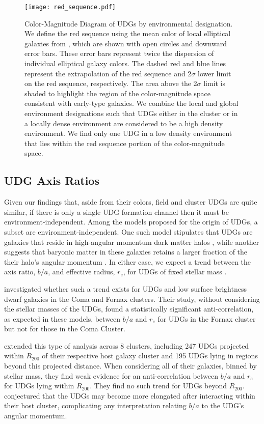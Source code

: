\documentclass[twocolumn,tighten]{aastex63}
\begin{document}
\begin{figure}
\texttt{[image: red\_sequence.pdf]}
\caption{Color-Magnitude Diagram of UDGs by environmental designation. We define the red sequence using the mean color of local elliptical galaxies from \cite{Schombert2016}, which are shown with open circles and downward error bars. These error bars represent twice the dispersion of individual elliptical galaxy colors. The dashed red and blue lines represent the extrapolation of the red sequence and 2$\sigma$ lower limit on the red sequence, respectively. The area above the 2$\sigma$ limit is shaded to highlight the region of the color-magnitude space consistent with early-type galaxies. We combine the local and global environment designations such that UDGs either in the cluster or in a locally dense environment are considered to be a high density environment. We find only one UDG in a low density environment that lies within the red sequence portion of the color-magnitude space.}
\label{fig:red_sequence}
\end{figure}

\subsection{UDG Axis Ratios}
\label{sec:axis_ratios}

Given our findings that, aside from their colors, field and cluster UDGs are quite similar, if there is only a single UDG formation channel then it must be environment-independent.
Among the models proposed for the origin of UDGs, a subset are 
environment-independent. 
One such model stipulates that UDGs are galaxies that reside in high-angular momentum dark matter halos 
\citep{Amorisco2016}, while another suggests that baryonic matter in these galaxies retains a larger fraction of the their halo's angular momentum \citep{Posti2018}.
In either case, we expect a trend between the axis ratio, $b/a$, and effective radius, $r_e$, for UDGs of fixed stellar mass \citep[cf.,][]{Dalcanton1997}. 

\cite{Venhola2017}  investigated whether such a trend exists for UDGs and low surface brightness dwarf galaxies in the Coma and Fornax clusters. Their study, without considering the stellar masses of the UDGs, found a statistically significant anti-correlation, as expected in these models, between $b/a$ and $r_e$ for UDGs in the Fornax cluster but not for those in the Coma Cluster.

\cite{Pina2019} extended this type of analysis across 8 clusters, including 247 UDGs projected within $R_{200}$ of their respective host galaxy cluster and 195 UDGs lying in regions beyond this projected distance.
When considering all of their galaxies, binned by stellar mass, they find weak evidence for an anti-correlation between $b/a$ and $r_e$ for UDGs lying within $R_{200}$. They find no such trend for UDGs beyond $R_{200}$. 
\cite{Pina2019} conjectured that the UDGs may become more elongated after interacting within their host cluster, complicating any interpretation relating $b/a$ to the UDG's angular momentum.
\end{document}
